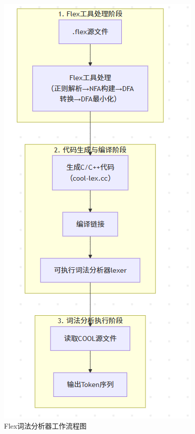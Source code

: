 \documentclass[twocolumn]{article}
\begin{document}
\begin{figure}[H]
    \centering
    \includegraphics[width=0.9\linewidth]{Flex_work.png}
    \caption{Flex词法分析器工作流程图}
    \label{fig:flex_workflow}
\end{figure}
\end{document}
